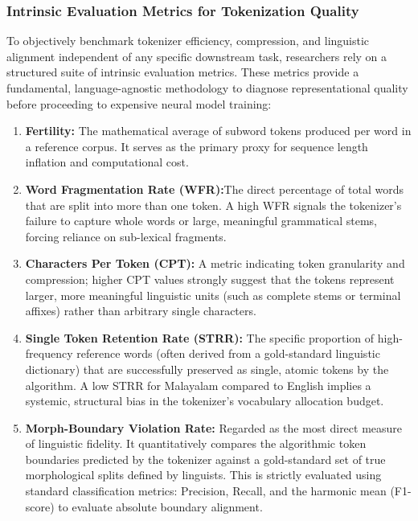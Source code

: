 \documentclass[12pt]{article}
\begin{document}
\subsubsection{Intrinsic Evaluation Metrics for Tokenization Quality }

To objectively benchmark tokenizer efficiency, compression, and linguistic alignment independent of any specific downstream task, researchers rely on a structured suite of intrinsic evaluation metrics. These metrics provide a fundamental, language-agnostic methodology to diagnose representational quality before proceeding to expensive neural model training: 
\begin{enumerate}
\item \textbf{Fertility:} The mathematical average of subword tokens produced per word in a reference corpus. It serves as the primary proxy for sequence length inflation and computational cost. 

\item \textbf{Word Fragmentation Rate (WFR):}The direct percentage of total words that are split into more than one token. A high WFR signals the tokenizer's failure to capture whole words or large, meaningful grammatical stems, forcing reliance on sub-lexical fragments. 

\item \textbf{Characters Per Token (CPT):} A metric indicating token granularity and compression; higher CPT values strongly suggest that the tokens represent larger, more meaningful linguistic units (such as complete stems or terminal affixes) rather than arbitrary single characters. 

\item \textbf{Single Token Retention Rate (STRR):} The specific proportion of high-frequency reference words (often derived from a gold-standard linguistic dictionary) that are successfully preserved as single, atomic tokens by the algorithm. A low STRR for Malayalam compared to English implies a systemic, structural bias in the tokenizer's vocabulary allocation budget.

\item \textbf{Morph-Boundary Violation Rate:} Regarded as the most direct measure of linguistic fidelity. It quantitatively compares the algorithmic token boundaries predicted by the tokenizer against a gold-standard set of true morphological splits defined by linguists. This is strictly evaluated using standard classification metrics: Precision, Recall, and the harmonic mean (F1-score) to evaluate absolute boundary alignment. 
\end{enumerate}
\end{document}
